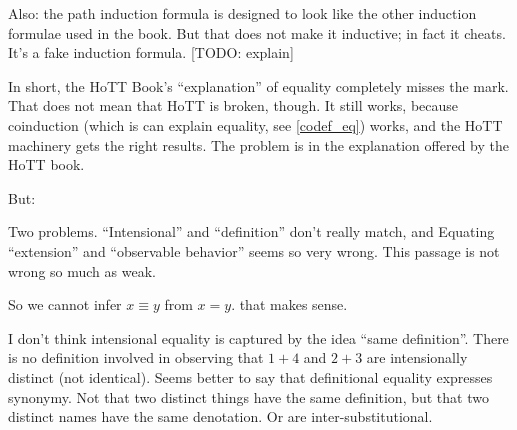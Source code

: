Also: the path induction formula is designed to look like the other
induction formulae used in the book. But that does not make it
inductive; in fact it cheats. It's a fake induction formula. [TODO:
  explain]

In short, the HoTT Book's ``explanation'' of equality completely
misses the mark. That does not mean that HoTT is broken, though. It
still works, because coinduction (which is can explain equality, see
\ref{codef_eq}) works, and the HoTT machinery gets the right results.
The problem is in the explanation offered by the HoTT book.

But:


Two problems. ``Intensional'' and ``definition'' don't really match,
and Equating ``extension'' and ``observable behavior'' seems so very
wrong.  This passage is not wrong so much as weak.


So we cannot infer \(x ≡ y\) from \(x = y\). that makes sense.

I don't think intensional equality is captured by the idea ``same
definition''. There is no definition involved in observing that
\(1+4\) and \(2+3\) are intensionally distinct (not identical). Seems
better to say that definitional equality expresses synonymy. Not that
two distinct things have the same definition, but that two distinct
names have the same denotation. Or are inter-substitutional.

